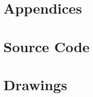 \documentclass[titlepage]{article} %
\begin{document}
\newpage
\section{Appendices}

\begin{appendices}

    \section{Source Code}
    \label{sec:source_code}
    
    
    


\section{Drawings}






\end{appendices}

\printbibliography
\end{document}

